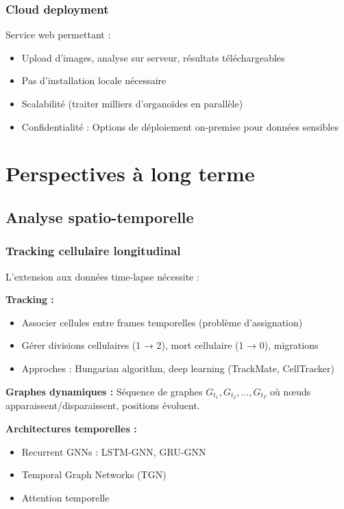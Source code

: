 \subsubsection{Cloud deployment}

Service web permettant :
\begin{itemize}
    \item Upload d'images, analyse sur serveur, résultats téléchargeables
    \item Pas d'installation locale nécessaire
    \item Scalabilité (traiter milliers d'organoïdes en parallèle)
    \item Confidentialité : Options de déploiement on-premise pour données sensibles
\end{itemize}

\section{Perspectives à long terme}

\subsection{Analyse spatio-temporelle}

\subsubsection{Tracking cellulaire longitudinal}

L'extension aux données time-lapse nécessite :

\textbf{Tracking :}
\begin{itemize}
    \item Associer cellules entre frames temporelles (problème d'assignation)
    \item Gérer divisions cellulaires (1 → 2), mort cellulaire (1 → 0), migrations
    \item Approches : Hungarian algorithm, deep learning (TrackMate, CellTracker)
\end{itemize}

\textbf{Graphes dynamiques :}
Séquence de graphes $G_{t_1}, G_{t_2}, \ldots, G_{t_T}$ où nœuds apparaissent/disparaissent, positions évoluent.

\textbf{Architectures temporelles :}
\begin{itemize}
    \item Recurrent GNNs : LSTM-GNN, GRU-GNN
    \item Temporal Graph Networks (TGN)
    \item Attention temporelle
\end{itemize}

